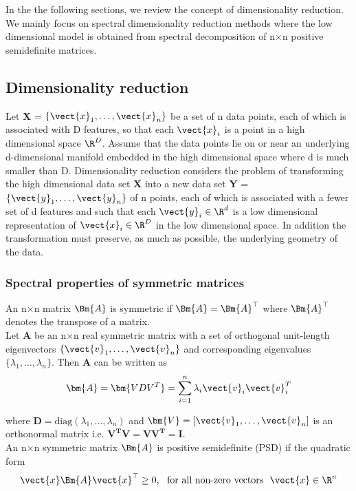 \newpage


In the the following sections, we review the concept of dimensionality reduction.
We mainly focus on spectral dimensionality reduction methods where the 
low dimensional model is obtained from spectral decomposition of n$\times$n
positive semidefinite matrices.

\subsection{Dimensionality reduction}
Let \textbf{X} = $\displaystyle \{\vect{x}_{1}, \ldots , \vect{x}_{n} \}$
be a set of n data points, each of which is associated with D features, so that each $\vect{x}_{i}$ is a point in a high dimensional space $\R^{D}$. Assume that the data points lie on or near an underlying d-dimensional manifold embedded in the high dimensional space where d is much smaller than D. Dimensionality reduction considers the problem of  transforming the high dimensional data set
$\textbf{X}$ into a new data set \textbf{Y} = $\displaystyle \{ \vect{y}_{1}, \ldots, \vect{y}_{n} \}$  of n points, each of which is associated
with a fewer set of d features and such that each $\vect{y}_{i} \in \R^{d}$ is a low dimensional representation of $\vect{x}_{i} \in \R^{D}$ in the low dimensional space. In addition the transformation must preserve, as much as possible, the underlying geometry of the data.



\subsubsection{Spectral properties of symmetric matrices}
An n$\times$n matrix $\Bm{A}$ is symmetric if $\Bm{A} = \Bm{A}^{\top}$
where $\Bm{A}^{\top}$ denotes the transpose of a matrix.\\
Let \textbf{A} be an n$\times$n real symmetric matrix with a set of 
orthogonal unit-length eigenvectors  $\{ \vect{v}_{1}, \ldots, \vect{v}_{n} \}$ and corresponding eigenvalues $\{\lambda_{1}, \ldots, \lambda_{n} \}.$ 
Then \textbf{A} can be written as 
\[ 
\bm{A} = \bm{VDV^{T}} = 
\sum_{i=1}^{n} \lambda_{i} \vect{v}_{i} \vect{v}_{i}^{T} 
\]

where $\bm{D} = \text{diag}(\lambda_{1}, \ldots, \lambda_{n})$ and  $ \bm{V} = [\vect{v}_{1}, \ldots, \vect{v}_{n}]$ is an orthonormal matrix i.e.
$\bm{V^{T}V  = VV^{T} = I}.$\\

An n$\times$n symmetric matrix $\Bm{A}$ is positive semidefinite (PSD) if the quadratic form
\[
\vect{x} \Bm{A} \vect{x}^{\top} \geq 0,\ \ \text{for all non-zero vectors} \ \ \vect{x} \in \R^{n}
\]

